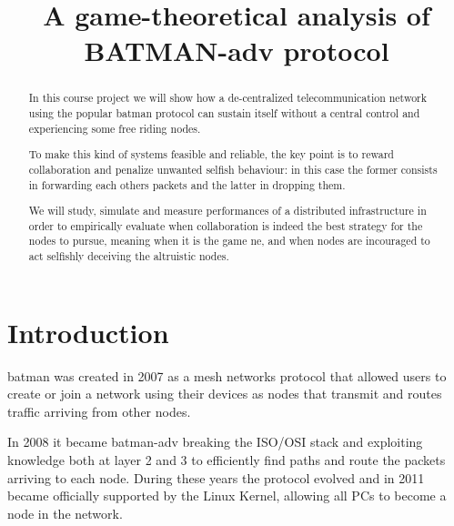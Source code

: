\documentclass[conference,10.5pt]{IEEEtran}
\begin{document}
\title{A game-theoretical analysis of BATMAN-adv protocol}

\author{
\and
{}
}

\maketitle

\begin{abstract}
  In this course project we will show how a de-centralized telecommunication network using the popular \gls{batman} protocol can sustain itself without a central control and experiencing some free riding nodes.

  To make this kind of systems feasible and reliable, the key point is to reward collaboration and penalize unwanted selfish behaviour: in this case the former consists in forwarding each others packets and the latter in dropping them.

  We will study, simulate and measure performances of a distributed infrastructure in order to empirically evaluate when collaboration is indeed the best strategy for the nodes to pursue, meaning when it is the game \gls{ne}, and when nodes are incouraged to act selfishly deceiving the altruistic nodes.
\end{abstract}

\section{Introduction}


\gls{batman} was created in 2007 as a mesh networks protocol that allowed users to create or join a network using their devices as nodes that transmit and routes traffic arriving from other nodes.

In 2008 it became \gls{batman}-adv breaking the ISO/OSI stack and exploiting knowledge both at layer 2 and 3 to efficiently find paths and route the packets arriving to each node. During these years the protocol evolved and in 2011 became officially supported by the Linux Kernel, allowing all PCs to become a node in the network.
\end{document}
